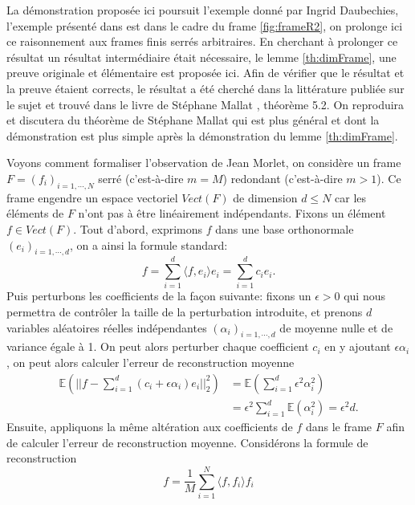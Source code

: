 \begin{remarque}\label{rq:lemmemallat}
La démonstration proposée ici poursuit l'exemple donné par Ingrid Daubechies, l'exemple présenté dans \cite{daubch3} est dans le cadre du frame \ref{fig:frameR2}, on prolonge ici ce raisonnement aux frames finis serrés arbitraires.
En cherchant à prolonger ce résultat un résultat intermédiaire était nécessaire, le lemme \ref{th:dimFrame}, une preuve originale et élémentaire est proposée ici.
Afin de vérifier que le résultat et la preuve étaient corrects, le résultat a été cherché dans la littérature publiée sur le sujet et trouvé dans le livre de Stéphane Mallat \cite{mallatframe}, théorème 5.2.
On reproduira et discutera du théorème de Stéphane Mallat qui est plus général et dont la démonstration est plus simple après la démonstration du lemme \ref{th:dimFrame}.
\end{remarque}
Voyons comment formaliser l'observation de Jean Morlet, on considère un frame $F=(f_i)_{i=1,\cdots,N}$ serré (c'est-à-dire $m=M$) redondant (c'est-à-dire $m>1$).
Ce frame engendre un espace vectoriel $Vect(F)$ de dimension $d\leq N$ car les éléments de $F$ n'ont pas à être linéairement indépendants.
Fixons un élément $f\in Vect(F)$.
Tout d'abord, exprimons $f$ dans une base orthonormale $(e_i)_{i=1,\cdots, d}$, on a ainsi la formule standard:
\begin{equation*}
	f = \sum_{i=1}^d \langle f, e_i \rangle e_i = \sum_{i=1}^d c_i e_i.
\end{equation*}
Puis perturbons les coefficients de la façon suivante: fixons un $\epsilon >0$ qui nous permettra de contrôler la taille de la perturbation introduite, et prenons $d$ variables aléatoires réelles indépendantes $(\alpha_i)_{i=1,\cdots, d}$ de moyenne nulle et de variance égale à 1.
On peut alors perturber chaque coefficient $c_i$ en y ajoutant $\epsilon \alpha_i$, on peut alors calculer l'erreur de reconstruction moyenne
\begin{align*}
	\mathbb{E}\left(|| f- \sum_{i=1}^d (c_i + \epsilon \alpha_i)e_i||_2^2\right) &= \mathbb{E}\left(\sum_{i=1}^d \epsilon^2 \alpha_i^2\right)\\
		&= \epsilon^2 \sum_{i=1}^d \mathbb{E} (\alpha_i^2) = \epsilon^2 d \label{eq:errorth}.
\end{align*} 
Ensuite, appliquons la même altération aux coefficients de $f$ dans le frame $F$ afin de calculer l'erreur de reconstruction moyenne.
Considérons la formule de reconstruction
\begin{equation*}
	f = \frac{1}{M}\sum_{i=1}^N \langle f, f_i \rangle f_i
\end{equation*}
